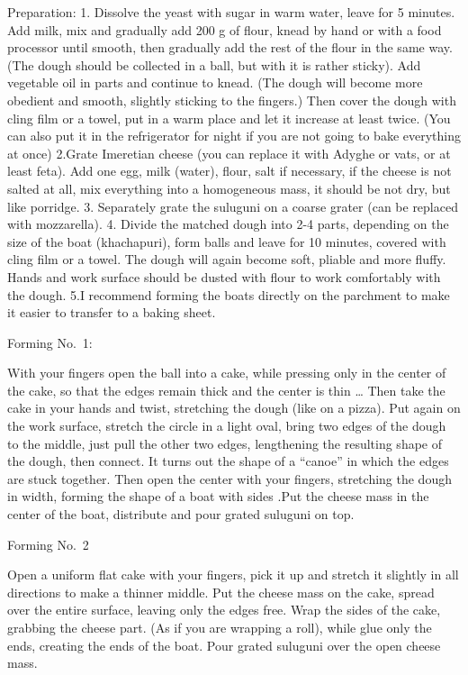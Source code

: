 \documentclass[
]{book}
\begin{document}
Preparation:
1. Dissolve the yeast with sugar in warm water, leave for 5 minutes. Add milk, mix and gradually add 200 g of flour, knead by hand or with a food processor until smooth, then gradually add the rest of the flour in the same way. (The dough should be collected in a ball, but with it is rather sticky). Add vegetable oil in parts and continue to knead. (The dough will become more obedient and smooth, slightly sticking to the fingers.) Then cover the dough with cling film or a towel, put in a warm place and let it increase at least twice. (You can also put it in the refrigerator for night if you are not going to bake everything at once)
2.Grate Imeretian cheese (you can replace it with Adyghe or vats, or at least feta). Add one egg, milk (water), flour, salt if necessary, if the cheese is not salted at all, mix everything into a homogeneous mass, it should be not dry, but like porridge.
3. Separately grate the suluguni on a coarse grater (can be replaced with mozzarella).
4. Divide the matched dough into 2-4 parts, depending on the size of the boat (khachapuri), form balls and leave for 10 minutes, covered with cling film or a towel. The dough will again become soft, pliable and more fluffy. Hands and work surface should be dusted with flour to work comfortably with the dough.
5.I recommend forming the boats directly on the parchment to make it easier to transfer to a baking sheet.

Forming No.~1:

With your fingers open the ball into a cake, while pressing only in the center of the cake, so that the edges remain thick and the center is thin \ldots{} Then take the cake in your hands and twist, stretching the dough (like on a pizza). Put again on the work surface, stretch the circle in a light oval, bring two edges of the dough to the middle, just pull the other two edges, lengthening the resulting shape of the dough, then connect. It turns out the shape of a ``canoe'' in which the edges are stuck together. Then open the center with your fingers, stretching the dough in width, forming the shape of a boat with sides .Put the cheese mass in the center of the boat, distribute and pour grated suluguni on top.

Forming No.~2

Open a uniform flat cake with your fingers, pick it up and stretch it slightly in all directions to make a thinner middle. Put the cheese mass on the cake, spread over the entire surface, leaving only the edges free. Wrap the sides of the cake, grabbing the cheese part. (As if you are wrapping a roll), while glue only the ends, creating the ends of the boat. Pour grated suluguni over the open cheese mass.
\end{document}
